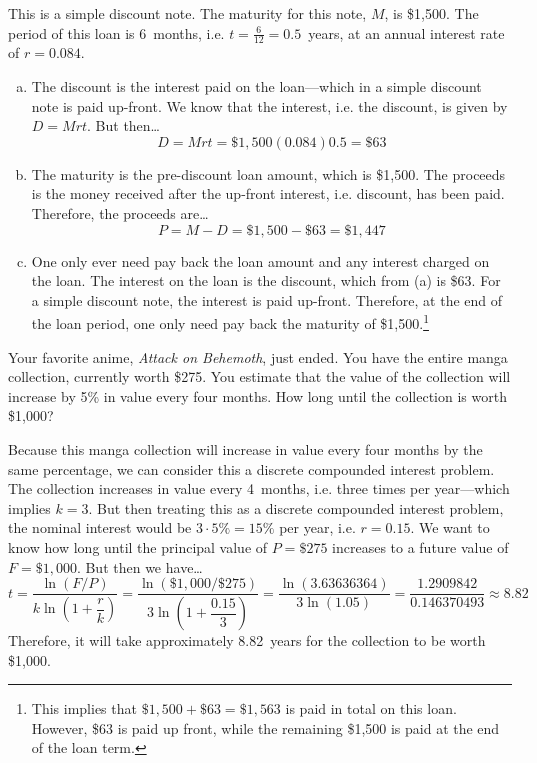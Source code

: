 \documentclass[12pt,letterpaper]{exam}
\begin{document}
\begin{questions}
\sol This is a simple discount note. The maturity for this note, $M$, is \$1,500. The period of this loan is 6~months, i.e. $t= \frac{6}{12}= 0.5$~years, at an annual interest rate of $r= 0.084$. 
        \begin{enumerate}[(a)]
        \item The discount is the interest paid on the loan---which in a simple discount note is paid up-front. We know that the interest, i.e. the discount, is given by $D= Mrt$. But then\dots
        		\[
		D= Mrt= \$1,\!500 (0.084) 0.5= \$63
		\] \pspace
	
        \item The maturity is the pre-discount loan amount, which is \$1,500. The proceeds is the money received after the up-front interest, i.e. discount, has been paid. Therefore, the proceeds are\dots
        		\[
		P= M - D= \$1,\!500 - \$63= \$1,\!447
		\] \pspace
	
        \item One only ever need pay back the loan amount and any interest charged on the loan. The interest on the loan is the discount, which from (a) is \$63. For a simple discount note, the interest is paid up-front. Therefore, at the end of the loan period, one only need pay back the maturity of \$1,500.\footnote{This implies that $\$1,\!500 + \$63= \$1,\!563$ is paid in total on this loan. However, \$63 is paid up front, while the remaining \$1,500 is paid at the end of the loan term.}
        \end{enumerate}



\newpage
\question[10] Your favorite anime, \textit{Attack on Behemoth}, just ended. You have the entire manga collection, currently worth \$275. You estimate that the value of the collection will increase by 5\% in value every four months. How long until the collection is worth \$1,000? \pspace

\sol Because this manga collection will increase in value every four months by the same percentage, we can consider this a discrete compounded interest problem. The collection increases in value every 4~months, i.e. three times per year---which implies $k= 3$. But then treating this as a discrete compounded interest problem, the nominal interest would be $3 \cdot 5\%= 15\%$ per year, i.e. $r= 0.15$. We want to know how long until the principal value of $P= \$275$ increases to a future value of $F= \$1,\!000$. But then we have\dots
	\[
	t= \dfrac{\ln(F/P)}{k \ln \left(1 + \dfrac{r}{k} \right)}= \dfrac{\ln(\$1,\!000/\$275)}{3 \ln \left(1 + \dfrac{0.15}{3} \right)}= \dfrac{\ln(3.63636364)}{3 \ln(1.05)}= \dfrac{1.2909842}{0.146370493} \approx 8.82
	\]
Therefore, it will take approximately 8.82~years for the collection to be worth \$1,000. \pspace


\end{questions}
\end{document}
